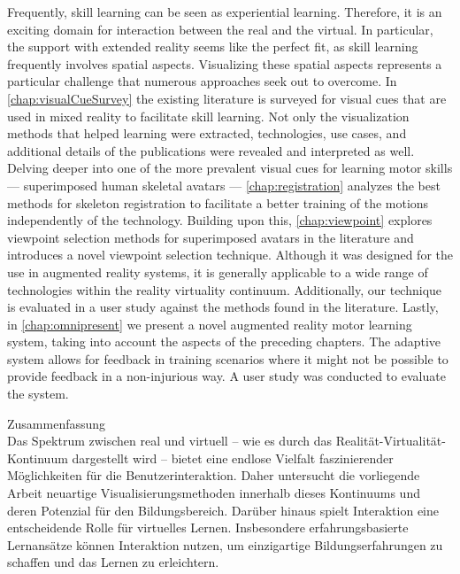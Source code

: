 Frequently, skill learning can be seen as experiential learning. Therefore, it is an exciting domain for interaction between the real and the virtual. In particular, the support with extended reality seems like the perfect fit, as skill learning frequently involves spatial aspects. Visualizing these spatial aspects represents a particular challenge that numerous approaches seek out to overcome. In \autoref{chap:visualCueSurvey} the existing literature is surveyed for visual cues that are used in mixed reality to facilitate skill learning. Not only the visualization methods that helped learning were extracted, technologies, use cases, and additional details of the publications were revealed and interpreted as well.
Delving deeper into one of the more prevalent visual cues for learning motor skills --- superimposed human skeletal avatars --- \autoref{chap:registration} analyzes the best methods for skeleton registration to facilitate a better training of the motions independently of the technology.
Building upon this, \autoref{chap:viewpoint} explores viewpoint selection methods for superimposed avatars in the literature and introduces a novel viewpoint selection technique. Although it was designed for the use in augmented reality systems, it is generally applicable to a wide range of technologies within the reality virtuality continuum. Additionally, our technique is evaluated in a user study against the methods found in the literature.
Lastly, in \autoref{chap:omnipresent} we present a novel augmented reality motor learning system, taking into account the aspects of the preceding chapters. The adaptive system allows for feedback in training scenarios where it might not be possible to provide feedback in a non-injurious way. A user study was conducted to evaluate the system.


\vspace*{20mm}

{Zusammenfassung}\label{sec:abstract-diff} \\

Das Spektrum zwischen real und virtuell – wie es durch das Realität-Virtualität-Kontinuum dargestellt wird – bietet eine endlose Vielfalt faszinierender Möglichkeiten für die Benutzerinteraktion. Daher untersucht die vorliegende Arbeit neuartige Visualisierungsmethoden innerhalb dieses Kontinuums und deren Potenzial für den Bildungsbereich. Darüber hinaus spielt Interaktion eine entscheidende Rolle für virtuelles Lernen. Insbesondere erfahrungsbasierte Lernansätze können Interaktion nutzen, um einzigartige Bildungserfahrungen zu schaffen und das Lernen zu erleichtern.


